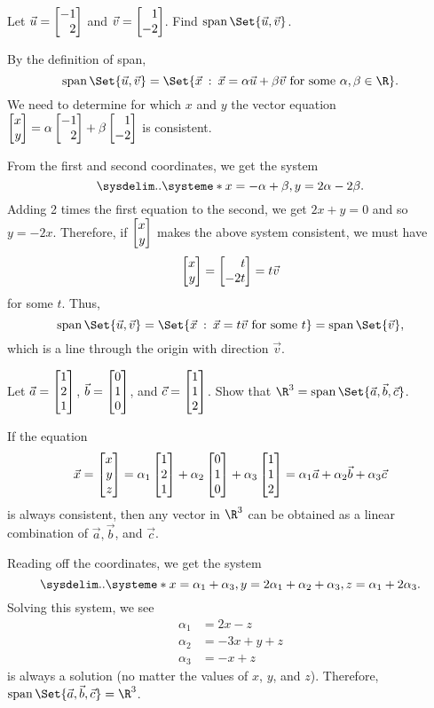 \begin{example}
	Let $\vec u=\mat{-1\\2}$ and $\vec v=\mat{1\\-2}$. Find $\Span\Set{\vec u,\vec v}$.

	By the definition of span,
	\[
		\Span\Set{\vec u,\vec v}=
		\Set{\vec x\given \vec x=\alpha\vec u+\beta\vec v\text{ for some }\alpha,\beta\in\R}.
	\]
	We need to determine for which $x$ and $y$ the vector equation $\mat{x\\y} = \alpha\mat{-1\\2}+\beta\mat{1\\-2}$ is consistent.
	
	From the first and second coordinates, we get the system
	\[
		\sysdelim..\systeme*{x=-\alpha+\beta, y=2\alpha-2\beta}.
	\]
	Adding 2 times the first equation to the second, we get $2x+y=0$ and so $y=-2x$.
	Therefore, if $\mat{x\\y}$ makes the above system consistent, we must have
	\[
		\mat{x\\y}=\mat{t\\-2t}=t\vec v
	\]
	for some $t$.
	Thus,
	\[
		\Span\Set{\vec u,\vec v}=
		\Set{\vec x\given \vec x=t\vec v\text{ for some }t}=\Span\Set{\vec v},
	\]
	which is a line through the origin with direction $\vec v$.
\end{example}

\begin{example}
	Let $\vec a=\mat{1\\2\\1}$, $\vec b=\mat{0\\1\\0}$, and $\vec c=\mat{1\\1\\2}$. Show that
	$\R^3=\Span\Set{\vec a,\vec b,\vec c}$.

	If the equation 
	\[
		\vec x=\mat{x\\y\\z} = \alpha_1\mat{1\\2\\1}+\alpha_2\mat{0\\1\\0}+\alpha_3\mat{1\\1\\2}
		 = \alpha_1\vec a+\alpha_2\vec b+\alpha_3\vec c
	\]
	is always consistent, then any vector in $\R^3$ can be obtained as a linear combination of
	$\vec a, \vec b$, and $\vec c$.
	
	Reading off the coordinates, we get the system
	\[
		\sysdelim..\systeme*{x=\alpha_1+\alpha_3, y=2\alpha_1+\alpha_2+\alpha_3, z=\alpha_1+2\alpha_3}.
	\]
	Solving this system, we see
	\[
		\begin{aligned}
			\alpha_1&=2x-z\\
			\alpha_2&=-3x+y+z\\
			\alpha_3&=-x+z
		\end{aligned}
	\]
	is always a solution (no matter the values of $x$, $y$, and $z$). Therefore,
	$\Span\Set{\vec a,\vec b,\vec c}=\R^3$.
\end{example}

